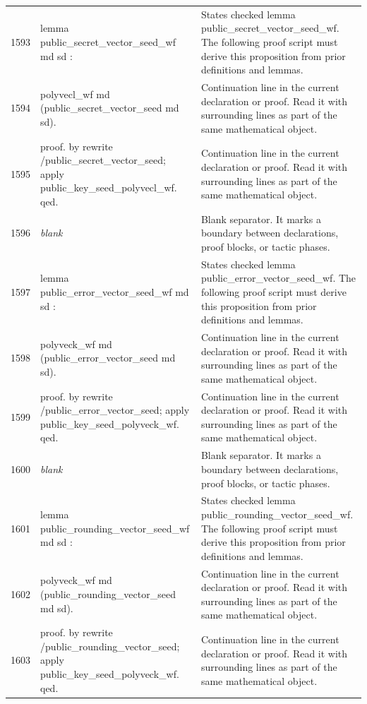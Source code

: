 \documentclass[10pt]{article}
\begin{document}
\begin{longtable}{r L{0.53\textwidth} L{0.37\textwidth}}
1593 & {\ttfamily\scriptsize lemma public\_secret\_vector\_seed\_wf md sd :} & States checked lemma public\_secret\_vector\_seed\_wf.  The following proof script must derive this proposition from prior definitions and lemmas. \\
1594 & {\ttfamily\scriptsize   polyvecl\_wf md (public\_secret\_vector\_seed md sd).} & Continuation line in the current declaration or proof.  Read it with surrounding lines as part of the same mathematical object. \\
1595 & {\ttfamily\scriptsize proof. by rewrite /public\_secret\_vector\_seed; apply public\_key\_seed\_polyvecl\_wf. qed.} & Continuation line in the current declaration or proof.  Read it with surrounding lines as part of the same mathematical object. \\
1596 & {\ttfamily\scriptsize \emph{blank}} & Blank separator.  It marks a boundary between declarations, proof blocks, or tactic phases. \\
1597 & {\ttfamily\scriptsize lemma public\_error\_vector\_seed\_wf md sd :} & States checked lemma public\_error\_vector\_seed\_wf.  The following proof script must derive this proposition from prior definitions and lemmas. \\
1598 & {\ttfamily\scriptsize   polyveck\_wf md (public\_error\_vector\_seed md sd).} & Continuation line in the current declaration or proof.  Read it with surrounding lines as part of the same mathematical object. \\
1599 & {\ttfamily\scriptsize proof. by rewrite /public\_error\_vector\_seed; apply public\_key\_seed\_polyveck\_wf. qed.} & Continuation line in the current declaration or proof.  Read it with surrounding lines as part of the same mathematical object. \\
1600 & {\ttfamily\scriptsize \emph{blank}} & Blank separator.  It marks a boundary between declarations, proof blocks, or tactic phases. \\
1601 & {\ttfamily\scriptsize lemma public\_rounding\_vector\_seed\_wf md sd :} & States checked lemma public\_rounding\_vector\_seed\_wf.  The following proof script must derive this proposition from prior definitions and lemmas. \\
1602 & {\ttfamily\scriptsize   polyveck\_wf md (public\_rounding\_vector\_seed md sd).} & Continuation line in the current declaration or proof.  Read it with surrounding lines as part of the same mathematical object. \\
1603 & {\ttfamily\scriptsize proof. by rewrite /public\_rounding\_vector\_seed; apply public\_key\_seed\_polyveck\_wf. qed.} & Continuation line in the current declaration or proof.  Read it with surrounding lines as part of the same mathematical object. \\

\end{longtable}
\end{document}
